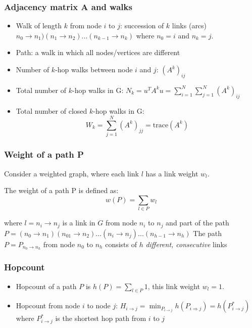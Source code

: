 \subsubsection{Adjacency matrix A and walks}
\begin{itemize}
  \item Walk of length $k$ from node $i$ to $j$: succession of $k$ links (arcs)
  $n_0 \rightarrow n_1)(n_1 \rightarrow n_2) ... (n_{k-1} \rightarrow n_k)$ where $n_0 = i$ and
  $n_k = j$.
  \item Path: a walk in which all nodes/vertices are different
  \item Number of $k$-hop walks between node $i$ and $j$: $(A^k)_{ij}$
  \item Total number of $k$-hop walks in G: $N_k = u^T A^k u = \sum_{i=1}^N \sum_{j=1}^N (A^k)_{ij}$
  \item Total number of closed $k$-hop walks in G:
  $$
  W_k = \sum_{j=1}^N (A^k)_{jj} = \text{trace}(A^k)
  $$
\end{itemize}

\subsubsection{Weight of a path P}
Consider a weighted graph, where each link $l$ has a link weight $w_l$.

The weight of a path P is defined as:
$$
w(P) = \sum_{l \in P} w_l
$$

where $l = n_i \rightarrow n_j$ is a link in $G$ from node $n_i$ to $n_j$ and part of the path
$P = (n_0 \rightarrow n_1)(n_01 \rightarrow n_2)...(n_i \rightarrow n_j)...(n_{h-1} \rightarrow n_h)$
The path $P = P_{n_0 \rightarrow n_h}$ from node $n_0$ to $n_h$ consists of $h$ \emph{different, 
consecutive} links

\subsubsection{Hopcount}
\begin{itemize}
  \item Hopcount of a path $P$ is $h(P) = \sum_{l \in P} 1$, this link weight $w_l = 1$. 
  \item Hopcount from node $i$ to node $j$: 
  $H_{i \rightarrow j} = \min_{P_{i \rightarrow j}} h(P_{i \Rightarrow j}) 
  = h(P_{i \rightarrow j}^{*})$ where $P_{i \rightarrow j}^*$ is the shortest hop path from
  $i$ to $j$
\end{itemize}


